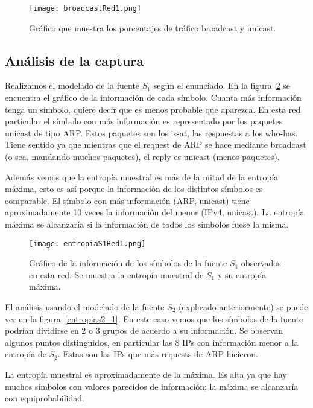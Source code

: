 
\begin{figure}[H]
\centering
\texttt{[image: broadcastRed1.png]}
\caption{Gráfico que muestra los porcentajes de tráfico broadcast y unicast.}
\label{broadcast1}
\end{figure}

\subsection{Análisis de la captura}

Realizamos el modelado de la fuente $S_1$ según el enunciado. En la figura~\ref{entropias1_1} se encuentra el gráfico de la información de cada símbolo. Cuanta más información tenga un símbolo, quiere decir que es menos probable que aparezca. En esta red particular el símbolo con más información es representado por los paquetes unicast de tipo ARP. Estos paquetes son los is-at, las respuestas a los who-has. Tiene sentido ya que mientras que el request de ARP se hace mediante broadcast (o sea, mandando muchos paquetes), el reply es unicast (menos paquetes).

Además vemos que la entropía muestral es más de la mitad de la entropía máxima, esto es así porque la información de los distintos símbolos es comparable. El símbolo con más información (ARP, unicast) tiene aproximadamente 10 veces la información del menor (IPv4, unicast). La entropía máxima se alcanzaría si la información de todos los símbolos fuese la misma.

\begin{figure}[H]
\centering
\texttt{[image: entropiaS1Red1.png]}
\caption{Gráfico de la información de los símbolos de la fuente $S_1$ observados en esta red. Se muestra la entropía muestral de $S_1$ y su entropía máxima.}
\label{entropias1_1}
\end{figure}

El análisis usando el modelado de la fuente $S_2$ (explicado anteriormente) se puede ver en la figura~\ref{entropias2_1}. En este caso vemos que los símbolos de la fuente podrían dividirse en 2 o 3 grupos de acuerdo a su información. Se observan algunos puntos distinguidos, en particular las 8 IPs con información menor a la entropía de $S_2$. Estas son las IPs que más requests de ARP hicieron. 

La entropía muestral es aproximadamente  de la máxima. Es alta ya que hay muchos símbolos con valores parecidos de información; la máxima se alcanzaría con equiprobabilidad.

